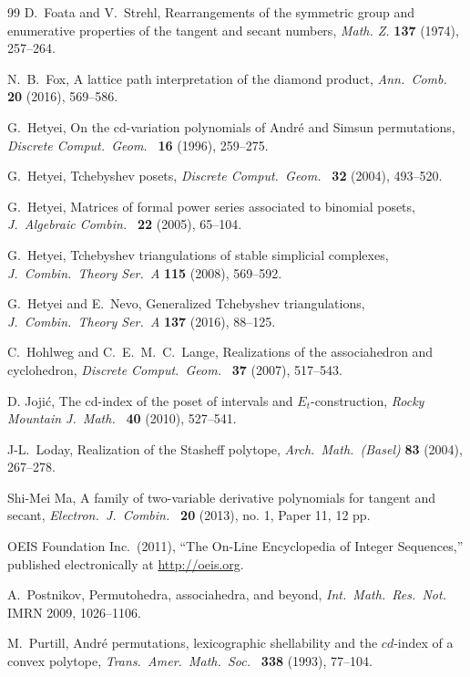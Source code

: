 \documentclass[reqno,12pt]{amsart}
\numberwithin{equation}{section}
\newcommand{\0}{\widehat{0}}
\newcommand{\1}{\widehat{1}}
\newcommand{\2}{\widehat{2}}
\begin{document}
\begin{thebibliography}{99}
 D.\ Foata and V.\ Strehl, Rearrangements of the
symmetric group and enumerative properties of the tangent and secant
numbers, {\it Math. Z.} {\bf 137} (1974), 257--264.

N.\ B.\ Fox, 
A lattice path interpretation of the diamond product,
{\it Ann.\ Comb.\ } {\bf 20} (2016), 569--586.   

G.\ Hetyei,
On the cd-variation polynomials of Andr\'e and Simsun permutations,
{\it Discrete Comput.\ Geom.\ } {\bf 16} (1996), 259--275. 
  
  G.\ Hetyei,
Tchebyshev posets,
{\it Discrete Comput.\ Geom.\ } {\bf 32} (2004), 493--520.   

G.\ Hetyei,
Matrices of formal power series associated to binomial posets,
{\it J.\ Algebraic Combin.\ } {\bf 22} (2005), 65--104.   

  G.\ Hetyei,
Tchebyshev triangulations of stable simplicial complexes,
{\it J.\ Combin.\ Theory Ser.\ A} {\bf 115} (2008), 569--592.   

  G.\ Hetyei and E.\ Nevo,
Generalized Tchebyshev triangulations,
{\it J.\ Combin.\ Theory Ser.\ A} {\bf 137} (2016), 88--125.   

C.\ Hohlweg and C.~E.~M.~C.~Lange, 
Realizations of the associahedron and cyclohedron,
{\it Discrete Comput.\ Geom.\ } {\bf 37 }(2007), 517--543.   

D. Joji\'{c}, 
The cd-index of the poset of intervals and $E_t$-construction,
{\it Rocky Mountain J.\ Math.\ } {\bf 40} (2010), 527--541.   


J-L.\ Loday, 
Realization of the Stasheff polytope,
{\it Arch.\ Math.\ (Basel)} {\bf 83} (2004), 267--278.   

Shi-Mei Ma,
A family of two-variable derivative polynomials for tangent and secant,
{\it Electron.\ J.\ Combin.\ } {\bf 20} (2013), no. 1, Paper 11, 12 pp.   

OEIS Foundation Inc.\ (2011), ``The On-Line Encyclopedia of Integer Sequences,''
published electronically at \url{http://oeis.org}. 

A.\ Postnikov,
Permutohedra, associahedra, and beyond,
{\it Int.\ Math.\ Res.\ Not.\ } IMRN 2009, 1026--1106.

  M.\ Purtill,
Andr\'e permutations, lexicographic shellability and the $cd$-index of a
convex polytope, 
{\it Trans.\ Amer.\ Math.\ Soc.\ } {\bf 338} (1993), 77--104. 
  


\end{thebibliography}
\end{document}
